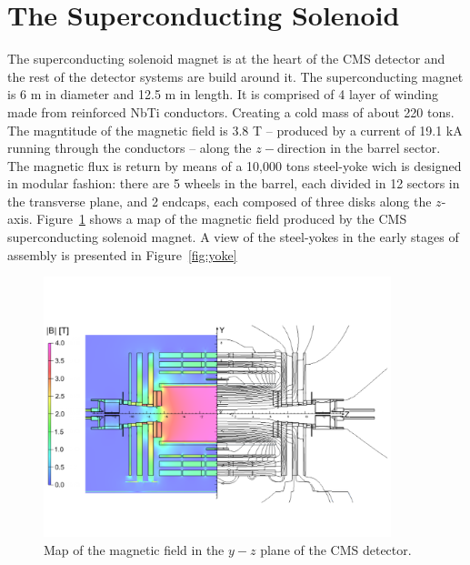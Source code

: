 \section{The Superconducting Solenoid}
The superconducting solenoid magnet is at the heart of the CMS
detector and the rest of the detector systems are build around it. The
superconducting magnet is 6 m in diameter and 12.5 m in length. It is
comprised of 4 layer of winding made from reinforced NbTi
conductors. Creating a cold mass of about 220 tons. The magntitude of
the magnetic field is 3.8 T -- produced by a  current of 19.1 kA
running through the conductors -- along the $z-$direction in the
barrel sector. The magnetic flux is return by means of a 10,000 tons
steel-yoke wich is designed in modular fashion: there are 5 wheels in
the barrel, each divided in 12 sectors in the transverse plane, and 2
endcaps, each composed of three disks along the
$z$-axis. Figure~\ref{fig:BField} shows a map of the magnetic field produced
by the CMS superconducting solenoid magnet. A view of the steel-yokes
in the early stages of assembly is presented in Figure~\ref{fig:yoke}
\begin{figure}
 \centering
\includegraphics[width=0.9\textwidth]{CMS_DetectorFigures/CMS_B_Field.pdf}
\caption{Map of the magnetic field in the $y-z$ plane of the CMS detector.\label{fig:BField}}
\end{figure}
